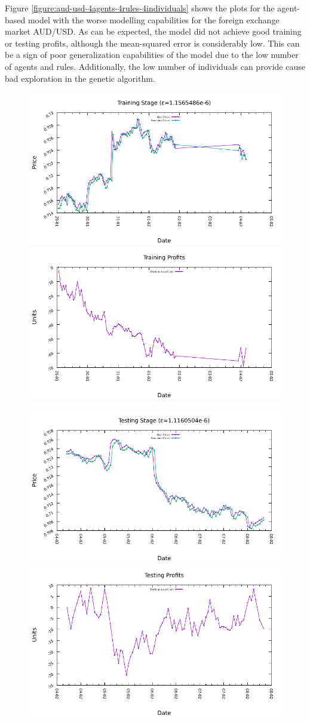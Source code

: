 Figure \ref{figure:aud-usd-4agents-4rules-4individuals} shows the plots for the
agent-based model with the worse modelling capabilities for the foreign exchange
market AUD/USD. As can be expected, the model did not achieve good training or
testing profits, although the mean-squared error is considerably low. This can
be a sign of poor generalization capabilities of the model due to the low number
of agents and rules. Additionally, the low number of individuals can provide
cause bad exploration in the genetic algorithm.

\begin{figure}[htp]
  \centering

  \includegraphics[width=.45\textwidth]{img/plots/aud_usd_h1-4agents-4rules-4ind-100gen_training_fit.pdf}\quad
  \includegraphics[width=.45\textwidth]{img/plots/aud_usd_h1-4agents-4rules-4ind-100gen_training_profits.pdf}

  \medskip

  \includegraphics[width=.45\textwidth]{img/plots/aud_usd_h1-4agents-4rules-4ind-100gen_testing_fit.pdf}\quad
  \includegraphics[width=.45\textwidth]{img/plots/aud_usd_h1-4agents-4rules-4ind-100gen_testing_profits.pdf}


\end{figure}
